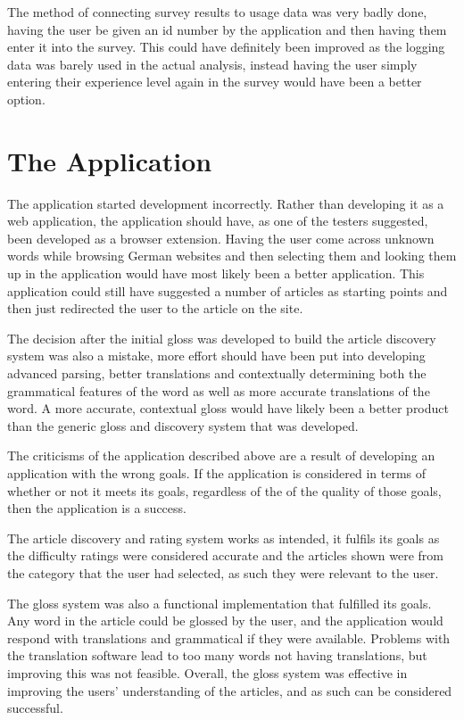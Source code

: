 The method of connecting survey results to usage data was very badly done, having the user be given an id number by the application and then having them enter it into the survey. This could have definitely been improved as the logging data was barely used in the actual analysis, instead having the user simply entering their experience level again in the survey would have been a better option. 

\section{The Application}

The application started development incorrectly. Rather than developing it as a web application, the application should have, as one of the testers suggested, been developed as a browser extension. Having the user come across unknown words while browsing German websites and then selecting them and looking them up in the application would have most likely been a better application. This application could still have suggested a number of articles as starting points and then just redirected the user to the article on the site. 

The decision after the initial gloss was developed to build the article discovery system was also a mistake, more effort should have been put into developing advanced parsing, better translations and contextually determining both the grammatical features of the word as well as more accurate translations of the word. A more accurate, contextual gloss would have likely been a better product than the generic gloss and discovery system that was developed.

The criticisms of the application described above are a result of developing an application with the wrong goals. If the application is considered in terms of whether or not it meets its goals, regardless of the of the quality of those goals, then the application is a success.

The article discovery and rating system works as intended, it fulfils its goals as the difficulty ratings were considered accurate and the articles shown were from the category that the user had selected, as such they were relevant to the user.  

The gloss system was also a functional implementation that fulfilled its goals. Any word in the article could be glossed by the user, and the application would respond with translations and grammatical if they were available. Problems with the translation software lead to too many words not having translations, but improving this was not feasible. Overall, the gloss system was effective in improving the users' understanding of the articles, and as such can be considered successful.


